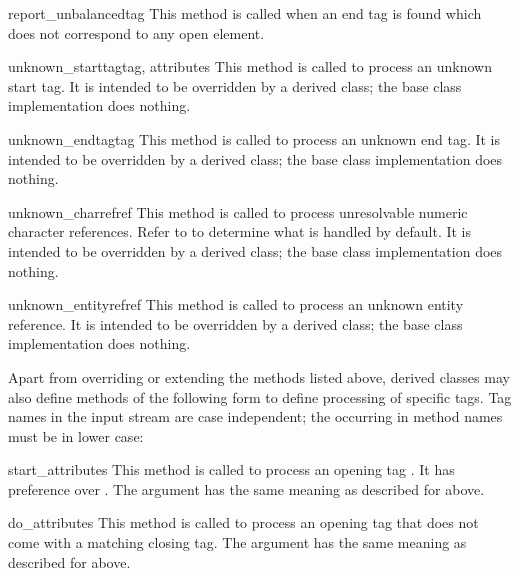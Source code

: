\begin{methoddesc}{report_unbalanced}{tag}
This method is called when an end tag is found which does not
correspond to any open element.
\end{methoddesc}

\begin{methoddesc}{unknown_starttag}{tag, attributes}
This method is called to process an unknown start tag.  It is intended
to be overridden by a derived class; the base class implementation
does nothing.
\end{methoddesc}

\begin{methoddesc}{unknown_endtag}{tag}
This method is called to process an unknown end tag.  It is intended
to be overridden by a derived class; the base class implementation
does nothing.
\end{methoddesc}

\begin{methoddesc}{unknown_charref}{ref}
This method is called to process unresolvable numeric character
references.  Refer to  to determine what is
handled by default.  It is intended to be overridden by a derived
class; the base class implementation does nothing.
\end{methoddesc}

\begin{methoddesc}{unknown_entityref}{ref}
This method is called to process an unknown entity reference.  It is
intended to be overridden by a derived class; the base class
implementation does nothing.
\end{methoddesc}

Apart from overriding or extending the methods listed above, derived
classes may also define methods of the following form to define
processing of specific tags.  Tag names in the input stream are case
independent; the  occurring in method names must be in lower
case:

\begin{methoddescni}{start_}{attributes}
This method is called to process an opening tag .  It has
preference over .  The
 argument has the same meaning as described for
 above.
\end{methoddescni}

\begin{methoddescni}{do_}{attributes}
This method is called to process an opening tag  that does
not come with a matching closing tag.  The  argument
has the same meaning as described for  above.
\end{methoddescni}

